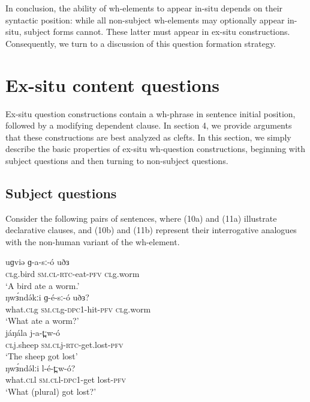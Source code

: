 In conclusion, the ability of wh-elements to appear in-situ depends on their syntactic position: while all non-subject wh-elements may optionally appear in-situ, subject forms cannot. These latter must appear in ex-situ constructions. Consequently, we turn to a discussion of this question formation strategy.


\section{Ex-situ content questions}

Ex-situ question constructions contain a wh-phrase in sentence initial position, followed by a modifying dependent clause. In section 4, we provide arguments that these constructions are best analyzed as clefts. In this section, we simply describe the basic properties of ex-situ wh-question constructions, beginning with subject questions and then turning to non-subject questions. 

\subsection{Subject questions}

Consider the following pairs of sentences, where (10a) and (11a) illustrate declarative clauses, and (10b) and (11b) represent their interrogative analogues with the non-human variant of the wh-element.

\ea
\ea \gll	uɡviə	ɡ-a-sː-ó	uðɜ\\
		\textsc{cl}g.bird	\textsc{sm.cl}-\textsc{rtc}-eat-\textsc{pfv}	\textsc{cl}g.worm\\
\trans		‘A bird ate a worm.’\\
\ex \gll	ŋwɜ́ndə́kːi	ɡ-é-sː-ó	uðɜ?		\\
		what.\textsc{cl}g	\textsc{sm.cl}g-\textsc{dpc}1-hit-\textsc{pfv}	\textsc{cl}g.worm\\
\trans		‘What ate a worm?’\\
\z
\z
\ea
\ea \gll	jáŋála	j-a-t̪ːw-ó	\\	
		\textsc{cl}j.sheep	\textsc{sm.cl}j-\textsc{rtc}-get.lost-\textsc{pfv}	\\
\trans		‘The sheep got lost’\\
\ex \gll	ŋwɜ́ndə́lːi	l-é-t̪ːw-ó?\\		
		what.\textsc{cl}l	\textsc{sm.cl}l-\textsc{dpc}1-get lost-\textsc{pfv}	\\
\trans		‘What (plural) got lost?’	\\
\z
\z

